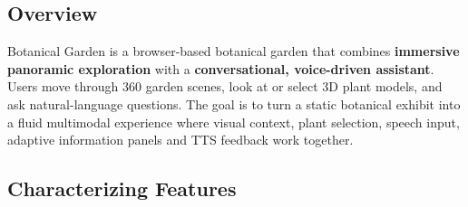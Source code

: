 \documentclass[12pt,a4paper]{article}
\begin{document}
\subsection{Overview}
Botanical Garden is a browser-based botanical garden that combines \textbf{immersive panoramic exploration} with a \textbf{conversational, voice-driven assistant}. Users move through 360\textdegree{} garden scenes, look at or select 3D plant models, and ask natural-language questions.
The goal is to turn a static botanical exhibit into a fluid multimodal
experience where visual context, plant selection, speech input, adaptive
information panels and TTS feedback work together.

\subsection{Characterizing Features}
\end{document}
